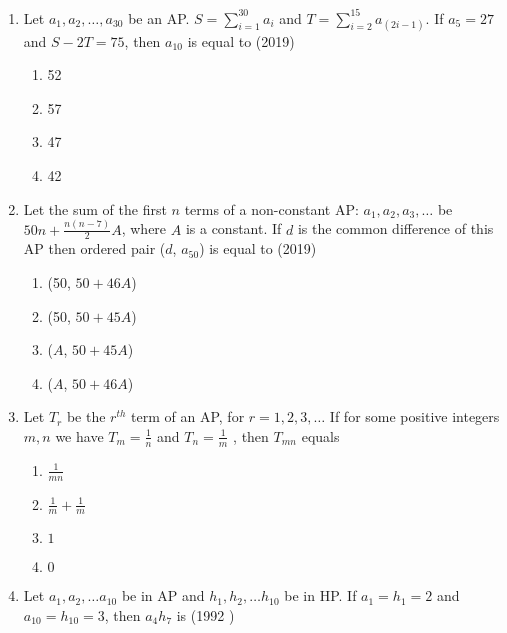 \begin{enumerate}    [label=\thesubsection.\arabic*, ref=\thesubsection.\theenumi]
\begin{multicols}{4}
\begin{enumerate}
  \item{330}
  \item{165}
  \item{190}
  \end{enumerate}
  \end{multicols}
  \item Let $a_{1}, a_{2}, \dots, a_{30}$ be an AP. $S=\sum_{i=1}^{30}a_{i}$ and $T=\sum_{i=2}^{15}a_{(2i-1)}$. If $a_{5}=27$
	  and $S-2T=75$,  then $a_{10}$ is equal to \null \hfill{(2019)}
\begin{multicols}{4}
\begin{enumerate}    
  \item {52} \item{57}
  \item{47}
  \item{42}
  \end{enumerate}
\end{multicols}
  \item Let the sum of the first $n$ terms of a non-constant AP: $a_{1}, a_{2}, a_{3}, \dots $ be $50n + \frac{n(n-7)}{2}A$,  where $A$ is a constant. If $d$ is the common difference of this AP then ordered pair ($d$, $a_{50}$) is equal to \hfill{(2019)} 
	  \begin{multicols}{4}
\begin{enumerate}    
	\item {(50,  $50+46A$)} \item{(50,  $50+45A$)}
  \item{($A$,  $50+45A$)}
  \item{($A$,  $50+46A$)}
  \end{enumerate}
\end{multicols}
%
\item Let $T_r$ be the $r^{th}$ term of an AP,  for $r=1, 2, 3, \dots$ If for some positive integers $m, n$ we have
$T_m=\frac{1}{n}$ and $T_n=\frac{1}{m}$ , then $T_{mn}$ equals \hfill{}
%
\begin{multicols}{4}
\begin{enumerate}    
\item $\frac{1}{mn}$
\item $\frac{1}{m} + \frac{1}{m}$
\item $1$
\item $0$
\end{enumerate}
\end{multicols}
\item Let ${a_1, a_2, \dots a_{10}}$ be in AP and ${h_1, h_2,  \dots h_{10}}$ be in HP. If ${a_1}={h_1}=2$ and ${a_{10}}={h_{10}}=3$,  then ${a_4h_7}$ is \hfill(1992 )

\end{enumerate}
